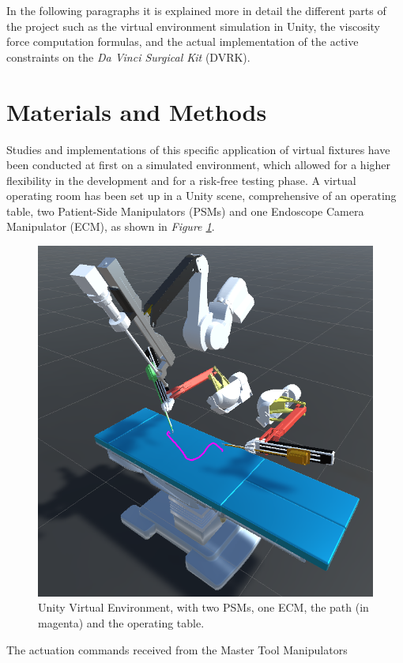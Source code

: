 \documentclass[conference]{IEEEtran}
\begin{document}
In the following paragraphs it is explained more in detail the
different parts of the project such as the virtual environment
simulation in Unity, the viscosity force computation formulas, and the
actual implementation of the active constraints on the \textit{Da
Vinci Surgical Kit} (DVRK).

\section{Materials and Methods}
Studies and implementations of this specific application of virtual
fixtures have been conducted at first on a simulated environment,
which allowed for a higher flexibility in the development and for a
risk-free testing phase. A virtual operating room has been set up in a
Unity scene, comprehensive of an operating table, two Patient-Side
Manipulators (PSMs) and one Endoscope Camera Manipulator (ECM), as
shown in \textit{Figure \ref{fig:Unity Scene}}. 
\begin{figure}[t]
    \centering
    \includegraphics[width=\linewidth]{unityscene.png}
    \caption{Unity Virtual Environment, with two PSMs, one ECM, the path (in magenta) and the operating table.}
    \label{fig:Unity Scene}
\end{figure}
The actuation commands received from the Master Tool Manipulators
\end{document}
